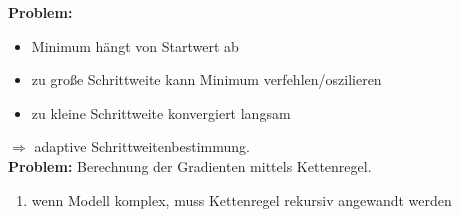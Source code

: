 	\textbf{Problem:}
	\begin{itemize}
		\item Minimum hängt von Startwert ab
		\item zu große Schrittweite kann Minimum verfehlen/oszilieren
		\item zu kleine Schrittweite konvergiert langsam
	\end{itemize}
	$\Rightarrow$ adaptive Schrittweitenbestimmung.\\[5pt]
	\textbf{Problem:} Berechnung der Gradienten mittels Kettenregel.\vspace*{-5pt}
	\begin{enumerate}[$\hookrightarrow$]
		\item wenn Modell komplex, muss Kettenregel rekursiv angewandt werden
	\end{enumerate}
	\newpage

